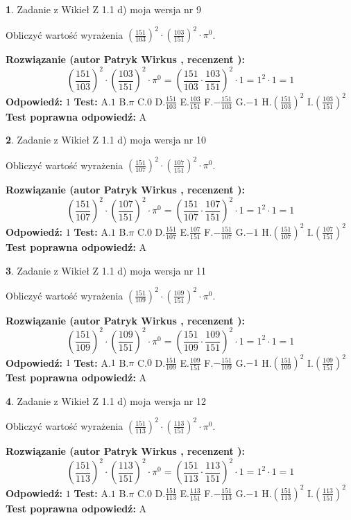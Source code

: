 \documentclass[12pt, a4paper]{article}
\theoremstyle{definition} %
\newtheorem{zad}{}
\newcommand{\zadStart}[1]{\begin{zad}#1\newline}
\newcommand{\zadStop}{\end{zad}}
\newcommand{\rozwStart}[2]{\noindent \textbf{Rozwiązanie (autor #1 , recenzent #2): }\newline}
\newcommand{\rozwStop}{\newline}
\newcommand{\odpStart}{\noindent \textbf{Odpowiedź:}\newline}
\newcommand{\odpStop}{\newline}
\newcommand{\testStart}{\noindent \textbf{Test:}\newline}
\newcommand{\testStop}{\newline}
\newcommand{\kluczStart}{\noindent \textbf{Test poprawna odpowiedź:}\newline}
\newcommand{\kluczStop}{\newline}
\begin{document}
\zadStart{Zadanie z Wikieł Z 1.1 d) moja wersja nr 9}

Obliczyć wartość wyrażenia $(\frac{151}{103})^{2} \cdot (\frac{103}{151})^{2} \cdot \pi^{0}$.
\zadStop
\rozwStart{Patryk Wirkus}{}
$$(\frac{151}{103})^{2} \cdot (\frac{103}{151})^{2} \cdot \pi^{0} = (\frac{151}{103} \cdot \frac{103}{151})^{2} \cdot 1 = 1^{2} \cdot 1 = 1$$
\rozwStop
\odpStart
$1$
\odpStop
\testStart
A.$1$ B.$\pi$ C.$0$ D.$\frac{151}{103}$ E.$\frac{103}{151}$
F.$-\frac{151}{103}$ G.$-1$
H.$(\frac{151}{103})^{2}$
I.$(\frac{103}{151})^{2}$
\testStop
\kluczStart
A
\kluczStop



\zadStart{Zadanie z Wikieł Z 1.1 d) moja wersja nr 10}

Obliczyć wartość wyrażenia $(\frac{151}{107})^{2} \cdot (\frac{107}{151})^{2} \cdot \pi^{0}$.
\zadStop
\rozwStart{Patryk Wirkus}{}
$$(\frac{151}{107})^{2} \cdot (\frac{107}{151})^{2} \cdot \pi^{0} = (\frac{151}{107} \cdot \frac{107}{151})^{2} \cdot 1 = 1^{2} \cdot 1 = 1$$
\rozwStop
\odpStart
$1$
\odpStop
\testStart
A.$1$ B.$\pi$ C.$0$ D.$\frac{151}{107}$ E.$\frac{107}{151}$
F.$-\frac{151}{107}$ G.$-1$
H.$(\frac{151}{107})^{2}$
I.$(\frac{107}{151})^{2}$
\testStop
\kluczStart
A
\kluczStop



\zadStart{Zadanie z Wikieł Z 1.1 d) moja wersja nr 11}

Obliczyć wartość wyrażenia $(\frac{151}{109})^{2} \cdot (\frac{109}{151})^{2} \cdot \pi^{0}$.
\zadStop
\rozwStart{Patryk Wirkus}{}
$$(\frac{151}{109})^{2} \cdot (\frac{109}{151})^{2} \cdot \pi^{0} = (\frac{151}{109} \cdot \frac{109}{151})^{2} \cdot 1 = 1^{2} \cdot 1 = 1$$
\rozwStop
\odpStart
$1$
\odpStop
\testStart
A.$1$ B.$\pi$ C.$0$ D.$\frac{151}{109}$ E.$\frac{109}{151}$
F.$-\frac{151}{109}$ G.$-1$
H.$(\frac{151}{109})^{2}$
I.$(\frac{109}{151})^{2}$
\testStop
\kluczStart
A
\kluczStop



\zadStart{Zadanie z Wikieł Z 1.1 d) moja wersja nr 12}

Obliczyć wartość wyrażenia $(\frac{151}{113})^{2} \cdot (\frac{113}{151})^{2} \cdot \pi^{0}$.
\zadStop
\rozwStart{Patryk Wirkus}{}
$$(\frac{151}{113})^{2} \cdot (\frac{113}{151})^{2} \cdot \pi^{0} = (\frac{151}{113} \cdot \frac{113}{151})^{2} \cdot 1 = 1^{2} \cdot 1 = 1$$
\rozwStop
\odpStart
$1$
\odpStop
\testStart
A.$1$ B.$\pi$ C.$0$ D.$\frac{151}{113}$ E.$\frac{113}{151}$
F.$-\frac{151}{113}$ G.$-1$
H.$(\frac{151}{113})^{2}$
I.$(\frac{113}{151})^{2}$
\testStop
\kluczStart
A
\kluczStop
\end{document}
